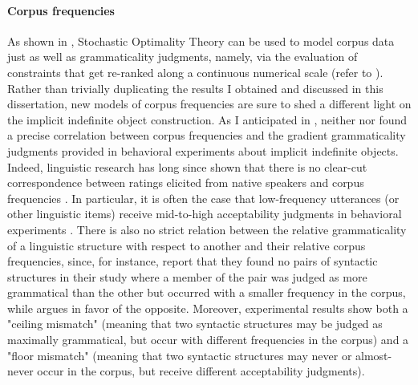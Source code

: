 
\paragraph{Corpus frequencies}

As shown in \textcite{Boersma2004, BoersmaHayes2001empirical}, Stochastic Optimality Theory can be used to model corpus data just as well as grammaticality judgments, namely, via the evaluation of constraints that get re-ranked along a continuous numerical scale (refer to ). Rather than trivially duplicating the results I obtained and discussed in this dissertation, new models of corpus frequencies are sure to shed a different light on the implicit indefinite object construction. As I anticipated in , neither \textcite{Resnik1993, Resnik1996} nor \textcite{Medina2007} found a precise correlation between corpus frequencies and the gradient grammaticality judgments provided in behavioral experiments about implicit indefinite objects.\\ %
Indeed, linguistic research has long since shown that there is no clear-cut correspondence between ratings elicited from native speakers and corpus frequencies \parencite{manning2003probabilistic}. In particular, it is often the case that low-frequency utterances (or other linguistic items) receive mid-to-high acceptability judgments in behavioral experiments \parencite{KempenHarbusch2005, BermelKnittl2012, BaderHaussler2010, Boersma2004, KellerAsudeh2002}. There is also no strict relation between the relative grammaticality of a linguistic structure with respect to another and their relative corpus frequencies, since, for instance, \textcite[315-316]{BaderHaussler2010} report that they found no pairs of syntactic structures in their study where a member of the pair was judged as more grammatical than the other but occurred with a smaller frequency in the corpus, while \textcite{Boersma2004} argues in favor of the opposite. Moreover, \textcite{BaderHaussler2010} experimental results show both a "ceiling mismatch" (meaning that two syntactic structures may be judged as maximally grammatical, but occur with different frequencies in the corpus) and a "floor mismatch" (meaning that two syntactic structures may never or almost-never occur in the corpus, but receive different acceptability judgments).\\
